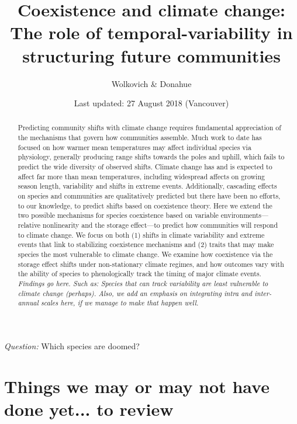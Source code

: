 \documentclass[11pt,a4paper,oneside]{article}
\begin{document}
\renewcommand{\labelitemi}{$-$}
\title{Coexistence and climate change: \\The role of
    temporal-variability in structuring future communities}
    \author{Wolkovich \& Donahue}
\date{Last updated: 27 August 2018 (Vancouver) \\ } %
\maketitle 

\begin{center}
\emph{Question:} Which species are doomed?
\end{center}

\begin{abstract} Predicting community shifts
with climate change requires fundamental appreciation of the
mechanisms that govern how communities assemble. Much work to date has
focused on how warmer mean temperatures may affect individual species
via physiology, generally producing range shifts towards the poles and
uphill, which fails to predict the wide diversity of observed shifts.
Climate change has and is expected to affect far more than mean
temperatures, including widespread affects on growing season
length, variability and shifts in extreme events. Additionally,
cascading effects on species and communities are qualitatively
predicted but there have been no efforts, to our knowledge, to predict
shifts based on coexistence theory. Here we extend the two possible
mechanisms for species coexistence based on variable environments---
relative nonlinearity and the storage effect---to predict how
communities will respond to climate change. We focus on both (1) shifts in
climate variability and extreme events that link to
stabilizing coexistence mechanisms and (2) traits that may
make species the most vulnerable to climate change. We examine how
coexistence via the storage effect shifts under non-stationary climate regimes, and how outcomes vary with the
ability of species to phenologically track the timing of major climate events. \emph{Findings go here. Such as: Species that can track variability are least vulnerable to climate change (perhaps).  Also, we add an emphasis on integrating intra and inter-annual scales here, if we manage to make that happen well.}
\end{abstract}

\newpage
\tableofcontents

\newpage
\section{Things we may or may not have done yet... to review}
\end{document}
